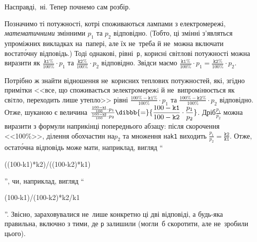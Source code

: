 \Tutorial
{}
Насправді,~ні. Тепер почнемо сам розбір.

Позначимо ті потужності, котрі споживаються лампами з електромережі, \emph{математичними} змінними $p_1$ та $p_2$ відповідно. (Тобто, ці змінні з'являться у\nolinebreak[3] проміжних викладках на~папері, але їх не~треба й не~можна включати в\nolinebreak[3] остат\'{о}чну відповідь.) Тоді однакові, рівні~\texttt{p}, корисні світлові потужності можна виразити як 
${\frac{\texttt{k1}\%}{100\%}\cdot{}p_1}$ та 
${\frac{\texttt{k2}\%}{100\%}\cdot{}p_2}$ відповідно. Звідси маємо 
${\frac{\texttt{k1}\%}{100\%}\cdot{}p_1}={\frac{\texttt{k2}\%}{100\%}\cdot{}p_2}$.

Потрібно ж знайти відношення не~корисних теплових потужностей, які, згідно примітки <<все, що споживається з\nolinebreak[2] електромережi й не~випромiнюється як свiтло, переходить лише у\nolinebreak[2] тепло>> рівні 
${\displaystyle\frac{100\%-\texttt{k1}\%}{100\%}\cdot{}p_1}$ та 
${\displaystyle\frac{100\%-\texttt{k2}\%}{100\%}\cdot{}p_2}$ відповідно.
Отже, шуканою є величина 
$\frac{\frac{100-\texttt{k1}}{100}\cdot{}p_1}{\frac{100-\texttt{k2}}{100}\cdot{}p_2}\dibbb{{=}}{\displaystyle\frac{100-\texttt{k1}}{100-\texttt{k2}}\cdot\frac{p_1}{p_2}}$. Дріб\nolinebreak[3] $\frac{p_1}{p_2}$ можна виразити з формули наприкінці попереднього абзацу: після скорочення <<100\%>>, ділення обох\nolinebreak[2] частин на\nolinebreak[3] $p_2$ та множення на\nolinebreak[3] \texttt{k1} виходить $\frac{p_1}{p_2}=\frac{\texttt{k2}}{\texttt{k1}}$. Отже, остат\'{о}чна відповідь може мати, наприклад, вигляд
``\begin{ttfamily}\mbox{((100-k1)*k2)/}\nolinebreak[3]\mbox{((100-k2)*k1)}\end{ttfamily}'', чи, наприклад, вигляд ``\begin{ttfamily}\mbox{(100-k1)/(100-k2)*}\nolinebreak[3]\mbox{k2/k1}\end{ttfamily}''. Звісно, зараховувалися не~лише конкретно ці дві відповіді, а будь-яка правильна, включно з тими, де \texttt{p} залишили (могли~б скоротити, але не~зробили цього).


